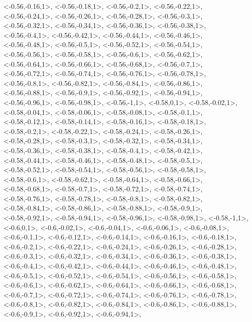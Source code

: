 \documentclass[a4paper,10pt]{article}
\begin{document}
\begin{eulernotebook}
\begin{euleroutput}
  <-0.56,-0.16,1>,
  <-0.56,-0.18,1>,
  <-0.56,-0.2,1>,
  <-0.56,-0.22,1>,
  <-0.56,-0.24,1>,
  <-0.56,-0.26,1>,
  <-0.56,-0.28,1>,
  <-0.56,-0.3,1>,
  <-0.56,-0.32,1>,
  <-0.56,-0.34,1>,
  <-0.56,-0.36,1>,
  <-0.56,-0.38,1>,
  <-0.56,-0.4,1>,
  <-0.56,-0.42,1>,
  <-0.56,-0.44,1>,
  <-0.56,-0.46,1>,
  <-0.56,-0.48,1>,
  <-0.56,-0.5,1>,
  <-0.56,-0.52,1>,
  <-0.56,-0.54,1>,
  <-0.56,-0.56,1>,
  <-0.56,-0.58,1>,
  <-0.56,-0.6,1>,
  <-0.56,-0.62,1>,
  <-0.56,-0.64,1>,
  <-0.56,-0.66,1>,
  <-0.56,-0.68,1>,
  <-0.56,-0.7,1>,
  <-0.56,-0.72,1>,
  <-0.56,-0.74,1>,
  <-0.56,-0.76,1>,
  <-0.56,-0.78,1>,
  <-0.56,-0.8,1>,
  <-0.56,-0.82,1>,
  <-0.56,-0.84,1>,
  <-0.56,-0.86,1>,
  <-0.56,-0.88,1>,
  <-0.56,-0.9,1>,
  <-0.56,-0.92,1>,
  <-0.56,-0.94,1>,
  <-0.56,-0.96,1>,
  <-0.56,-0.98,1>,
  <-0.56,-1,1>,
  <-0.58,0,1>,
  <-0.58,-0.02,1>,
  <-0.58,-0.04,1>,
  <-0.58,-0.06,1>,
  <-0.58,-0.08,1>,
  <-0.58,-0.1,1>,
  <-0.58,-0.12,1>,
  <-0.58,-0.14,1>,
  <-0.58,-0.16,1>,
  <-0.58,-0.18,1>,
  <-0.58,-0.2,1>,
  <-0.58,-0.22,1>,
  <-0.58,-0.24,1>,
  <-0.58,-0.26,1>,
  <-0.58,-0.28,1>,
  <-0.58,-0.3,1>,
  <-0.58,-0.32,1>,
  <-0.58,-0.34,1>,
  <-0.58,-0.36,1>,
  <-0.58,-0.38,1>,
  <-0.58,-0.4,1>,
  <-0.58,-0.42,1>,
  <-0.58,-0.44,1>,
  <-0.58,-0.46,1>,
  <-0.58,-0.48,1>,
  <-0.58,-0.5,1>,
  <-0.58,-0.52,1>,
  <-0.58,-0.54,1>,
  <-0.58,-0.56,1>,
  <-0.58,-0.58,1>,
  <-0.58,-0.6,1>,
  <-0.58,-0.62,1>,
  <-0.58,-0.64,1>,
  <-0.58,-0.66,1>,
  <-0.58,-0.68,1>,
  <-0.58,-0.7,1>,
  <-0.58,-0.72,1>,
  <-0.58,-0.74,1>,
  <-0.58,-0.76,1>,
  <-0.58,-0.78,1>,
  <-0.58,-0.8,1>,
  <-0.58,-0.82,1>,
  <-0.58,-0.84,1>,
  <-0.58,-0.86,1>,
  <-0.58,-0.88,1>,
  <-0.58,-0.9,1>,
  <-0.58,-0.92,1>,
  <-0.58,-0.94,1>,
  <-0.58,-0.96,1>,
  <-0.58,-0.98,1>,
  <-0.58,-1,1>,
  <-0.6,0,1>,
  <-0.6,-0.02,1>,
  <-0.6,-0.04,1>,
  <-0.6,-0.06,1>,
  <-0.6,-0.08,1>,
  <-0.6,-0.1,1>,
  <-0.6,-0.12,1>,
  <-0.6,-0.14,1>,
  <-0.6,-0.16,1>,
  <-0.6,-0.18,1>,
  <-0.6,-0.2,1>,
  <-0.6,-0.22,1>,
  <-0.6,-0.24,1>,
  <-0.6,-0.26,1>,
  <-0.6,-0.28,1>,
  <-0.6,-0.3,1>,
  <-0.6,-0.32,1>,
  <-0.6,-0.34,1>,
  <-0.6,-0.36,1>,
  <-0.6,-0.38,1>,
  <-0.6,-0.4,1>,
  <-0.6,-0.42,1>,
  <-0.6,-0.44,1>,
  <-0.6,-0.46,1>,
  <-0.6,-0.48,1>,
  <-0.6,-0.5,1>,
  <-0.6,-0.52,1>,
  <-0.6,-0.54,1>,
  <-0.6,-0.56,1>,
  <-0.6,-0.58,1>,
  <-0.6,-0.6,1>,
  <-0.6,-0.62,1>,
  <-0.6,-0.64,1>,
  <-0.6,-0.66,1>,
  <-0.6,-0.68,1>,
  <-0.6,-0.7,1>,
  <-0.6,-0.72,1>,
  <-0.6,-0.74,1>,
  <-0.6,-0.76,1>,
  <-0.6,-0.78,1>,
  <-0.6,-0.8,1>,
  <-0.6,-0.82,1>,
  <-0.6,-0.84,1>,
  <-0.6,-0.86,1>,
  <-0.6,-0.88,1>,
  <-0.6,-0.9,1>,
  <-0.6,-0.92,1>,
  <-0.6,-0.94,1>,

\end{euleroutput}
\end{eulernotebook}
\end{document}
